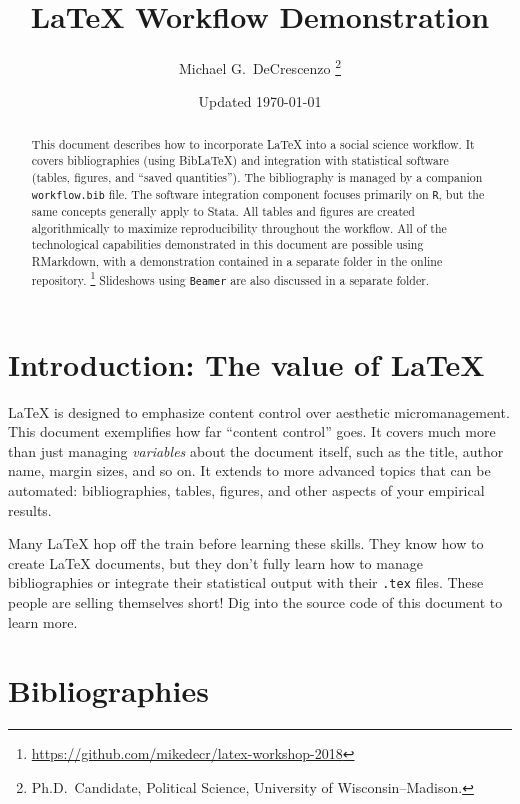 \documentclass[12pt
              ]{article}
\begin{document}
\title{{\LaTeX} Workflow Demonstration}
\author{Michael G.\ DeCrescenzo%
          \thanks{Ph.D.\ Candidate, Political Science, University of Wisconsin--Madison.}}
\date{Updated \today}
\maketitle


\begin{abstract}
  This document describes how to incorporate {\LaTeX} into a social science workflow. It covers bibliographies (using Bib{\LaTeX}) and integration with statistical software (tables, figures, and ``saved quantities''). The bibliography is managed by a companion \texttt{workflow.bib} file. The software integration component focuses primarily on \texttt{R}, but the same concepts generally apply to Stata. All tables and figures are created algorithmically to maximize reproducibility throughout the workflow. All of the technological capabilities demonstrated in this document are possible using RMarkdown, with a demonstration contained in a separate folder in the online repository.%
    \footnote{\url{https://github.com/mikedecr/latex-workshop-2018}}
  Slideshows using \texttt{Beamer} are also discussed in a separate folder. 
\end{abstract}



\onehalfspacing


\section{Introduction: The value of {\LaTeX}}

{\LaTeX} is designed to emphasize content control over aesthetic micromanagement. This document exemplifies how far ``content control'' goes. It covers much more than just managing \emph{variables} about the document itself, such as the title, author name, margin sizes, and so on. It extends to more advanced topics that can be automated: bibliographies, tables, figures, and other aspects of your empirical results.

Many {\LaTeX} hop off the train before learning these skills. They know how to create {\LaTeX} documents, but they don't fully learn how to manage bibliographies or integrate their statistical output with their \texttt{.tex} files. These people are selling themselves short! Dig into the source code of this document to learn more.


\section{Bibliographies}
\end{document}
